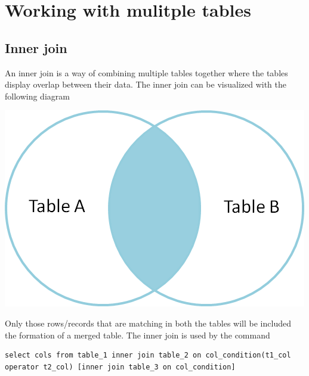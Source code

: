 \documentclass{article}
\begin{document}
\section{Working with mulitple tables}

\subsection{Inner join}

An inner join is a way of combining multiple tables together where the tables display overlap between their data. 
The inner join can be visualized with the following diagram
\begin{center}
    \includegraphics[scale=0.5]{img/innerjoin.png}
\end{center}
Only those rows/records that are matching in both the tables will be included the formation of a merged table.
The inner join is used by the command 
\begin{lstlisting}[frame=single]
    select cols from table_1 inner join table_2 on col_condition(t1_col operator t2_col) [inner join table_3 on col_condition]
\end{lstlisting}
\end{document}
